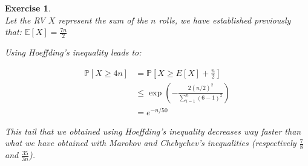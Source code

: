 \documentclass{article}
\newtheorem{exo}{Exercise}
\def\P{\mathbb{P}}
\def\E{\mathbb{E}}
\begin{document}
\begin{exo}{\ \\}
Let the RV $X$ represent the sum of the $n$ rolls, we have established previously that: $\E[X] = \frac{7n}{2}$


Using Hoeffding's inequality leads to:

\begin{align*}
    \P[X \geq 4n] 
    &= \P[X \geq E[X]+ \frac{n}{2} ] \\
    &\leq \exp{\left(-\frac{2 (n/2)^2}{\sum^{n}_{i=1} (6-1)^2}\right)} \\
    &= e^{-n/50} 
\end{align*}

This tail that we obtained using Hoeffding's inequality decreases way faster than what we have obtained with Marokov and Chebychev's inequalities (respectively $\frac{7}{8}$ and $\frac{35}{3n}$).

\end{exo}
\end{document}
